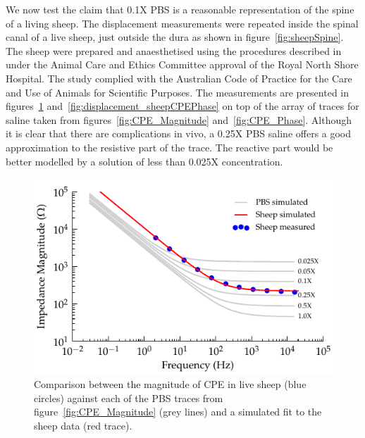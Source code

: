 \documentclass[journal, a4paper]{IEEEtran}
\begin{document}
{We now test the claim that 0.1X PBS is a reasonable representation of the spine of a living sheep.
The displacement measurements were repeated inside the spinal canal of a live sheep, just outside the dura as shown in figure~\ref{fig:sheepSpine}. The sheep were prepared and anaesthetised using the procedures described in \cite{Parker2013} under the Animal Care and Ethics Committee approval of the Royal North Shore Hospital. The study complied with the Australian Code of Practice for the Care and Use of Animals for Scientific Purposes. The measurements are presented in figures~\ref{fig:displacement_sheepCPEMagnitude} and~\ref{fig:displacement_sheepCPEPhase} on top of the array of traces for saline taken from figures~\ref{fig:CPE_Magnitude}
and~\ref{fig:CPE_Phase}.
Although it is clear that there are complications in vivo, a 0.25X PBS saline offers a good approximation to the resistive part of the trace.
The reactive part would be better modelled by a solution of less than 0.025X concentration.


\begin{figure}
    \begin{center}
        \includegraphics{graphics/displacement-withSheep_impedanceVsFrequency_magnitude}
    \end{center}
    \caption{Comparison between the magnitude of CPE in live sheep (blue circles) against each of the PBS traces from figure~\ref{fig:CPE_Magnitude} (grey lines) and a simulated fit to the sheep data (red trace).}
    \label{fig:displacement_sheepCPEMagnitude}
\end{figure}

}
\end{document}
